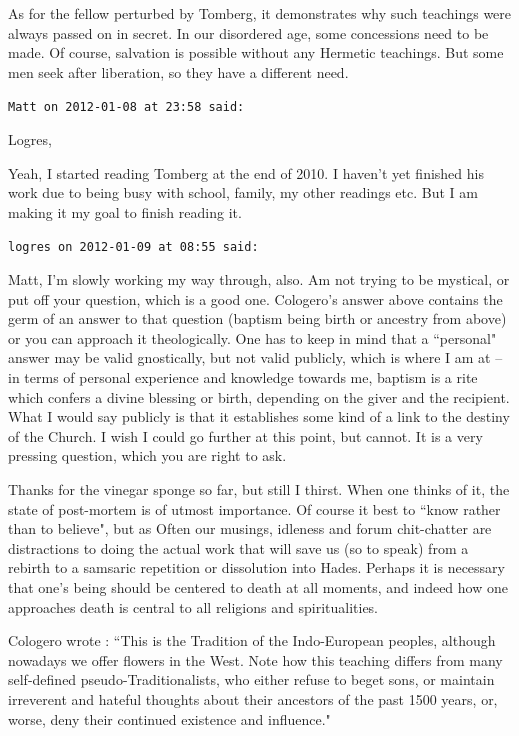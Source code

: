 \begin{footnotesize}
\begin{sffamily}
\begin{quotex}
\end{quotex}
As for the fellow perturbed by Tomberg, it demonstrates why such teachings were always passed on in secret. In our disordered age, some concessions need to be made. Of course, salvation is possible without any Hermetic teachings. But some men seek after liberation, so they have a different need.


\hfill

\texttt{Matt on 2012-01-08 at 23:58 said: }

Logres,

Yeah, I started reading Tomberg at the end of 2010. I haven't yet finished his work due to being busy with school, family, my other readings etc. But I am making it my goal to finish reading it.


\hfill

\texttt{logres on 2012-01-09 at 08:55 said: }

Matt, I'm slowly working my way through, also. Am not trying to be mystical, or put off your question, which is a good one. Cologero's answer above contains the germ of an answer to that question (baptism being birth or ancestry from above) or you can approach it theologically. One has to keep in mind that a ``personal" answer may be valid gnostically, but not valid publicly, which is where I am at – in terms of personal experience and knowledge towards me, baptism is a rite which confers a divine blessing or birth, depending on the giver and the recipient. What I would say publicly is that it establishes some kind of a link to the destiny of the Church. I wish I could go further at this point, but cannot. It is a very pressing question, which you are right to ask.


\hfill

Thanks for the vinegar sponge so far, but still I thirst. When one thinks of it, the state of post-mortem is of utmost importance. Of course it best to ``know rather than to believe", but as Often our musings, idleness and forum chit-chatter are distractions to doing the actual work that will save us (so to speak) from a rebirth to a samsaric repetition or dissolution into Hades. Perhaps it is necessary that one's being should be centered to death at all moments, and indeed how one approaches death is central to all religions and spiritualities. 

Cologero wrote : ``This is the Tradition of the Indo-European peoples, although nowadays we offer flowers in the West. Note how this teaching differs from many self-defined pseudo-Traditionalists, who either refuse to beget sons, or maintain irreverent and hateful thoughts about their ancestors of the past 1500 years, or, worse, deny their continued existence and influence."


\end{sffamily}
\end{footnotesize}

